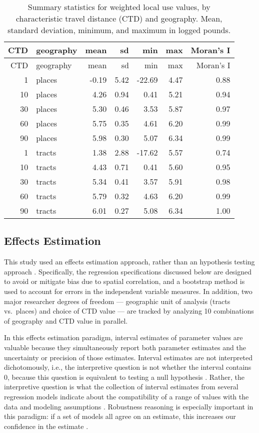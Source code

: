 \documentclass[ijerph,article,submit,oneauthor,pdftex]{Definitions/mdpi}
\begin{document}
\begin{longtable}[]{@{}rlrrrrr@{}}
\caption{Summary statistics for weighted local use values, by characteristic travel distance (CTD) and geography. Mean, standard deviation, minimum, and maximum in logged pounds. \label{tab.dv}}\tabularnewline
\toprule
CTD & geography & mean & sd & min & max & Moran's I\tabularnewline
\midrule
\endfirsthead
\toprule
CTD & geography & mean & sd & min & max & Moran's I\tabularnewline
\midrule
\endhead
1 & places & -0.19 & 5.42 & -22.69 & 4.47 & 0.88\tabularnewline
10 & places & 4.26 & 0.94 & 0.41 & 5.21 & 0.94\tabularnewline
30 & places & 5.30 & 0.46 & 3.53 & 5.87 & 0.97\tabularnewline
60 & places & 5.75 & 0.35 & 4.61 & 6.20 & 0.99\tabularnewline
90 & places & 5.98 & 0.30 & 5.07 & 6.34 & 0.99\tabularnewline
1 & tracts & 1.38 & 2.88 & -17.62 & 5.57 & 0.74\tabularnewline
10 & tracts & 4.43 & 0.71 & 0.41 & 5.60 & 0.95\tabularnewline
30 & tracts & 5.34 & 0.41 & 3.57 & 5.91 & 0.98\tabularnewline
60 & tracts & 5.79 & 0.32 & 4.63 & 6.20 & 0.99\tabularnewline
90 & tracts & 6.01 & 0.27 & 5.08 & 6.34 & 1.00\tabularnewline
\bottomrule
\end{longtable}

\hypertarget{effects-estimation}{%
\subsection{Effects Estimation}\label{effects-estimation}}

This study used an effects estimation approach, rather than an hypothesis testing approach \citep{CummingNewStatisticsWhy2014}. Specifically, the regression specifications discussed below are designed to avoid or mitigate bias due to spatial correlation, and a bootstrap method is used to account for errors in the independent variable measures. In addition, two major researcher degrees of freedom \citep{SimmonsFalsePositivePsychology2011} --- geographic unit of analysis (tracts vs.~places) and choice of CTD value --- are tracked by analyzing 10 combinations of geography and CTD value in parallel.

In this effects estimation paradigm, interval estimates of parameter values are valuable because they simultaneously report both parameter estimates and the uncertainty or precision of those estimates. Interval estimates are not interpreted dichotomously, i.e., the interpretive question is not whether the interval contains 0, because this question is equivalent to testing a null hypothesis \citep{CummingNewStatisticsWhy2014}. Rather, the interpretive question is what the collection of interval estimates from several regression models indicate about the compatibility of a range of values with the data and modeling assumptions \citep{GreenlandStatisticalTestsValues2016}. Robustness reasoning is especially important in this paradigm: if a set of models all agree on an estimate, this increases our confidence in the estimate \citep{LloydModelRobustnessConfirmatory2015}.
\end{document}

